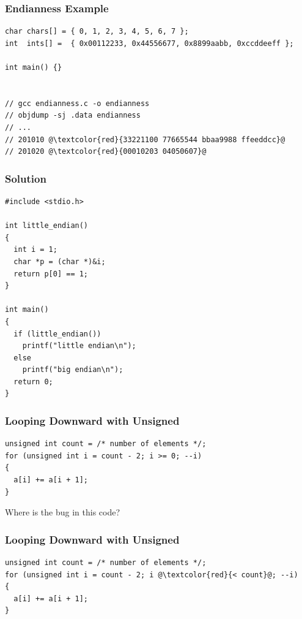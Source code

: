 \documentclass{beamer}
\newcounter{exo}
\newcommand{\exo}{
  \addtocounter{exo}{1}
  Exercice \arabic{exo}
}
\begin{document}
\begin{frame}[fragile]
\frametitle{Endianness Example}
\scriptsize
\begin{lstlisting}
char chars[] = { 0, 1, 2, 3, 4, 5, 6, 7 };
int  ints[] =  { 0x00112233, 0x44556677, 0x8899aabb, 0xccddeeff };

int main() {}


// gcc endianness.c -o endianness
// objdump -sj .data endianness
// ...
// 201010 @\textcolor{red}{33221100 77665544 bbaa9988 ffeeddcc}@
// 201020 @\textcolor{red}{00010203 04050607}@
\end{lstlisting}

\end{frame}


\ifanswers

\begin{frame}[fragile]
\frametitle{Solution}
\scriptsize

\begin{lstlisting}
#include <stdio.h>

int little_endian()
{
  int i = 1;
  char *p = (char *)&i;
  return p[0] == 1;
}

int main()
{
  if (little_endian())
    printf("little endian\n");
  else
    printf("big endian\n");
  return 0;
}
\end{lstlisting}

\end{frame}

\fi

\begin{frame}[fragile]
\frametitle{Looping Downward with Unsigned}

\begin{lstlisting}
unsigned int count = /* number of elements */;
for (unsigned int i = count - 2; i >= 0; --i)
{
  a[i] += a[i + 1];
}
\end{lstlisting}

\vspace{0.5cm}
Where is the bug in this code?
\end{frame}

\begin{frame}[fragile]
\frametitle{Looping Downward with Unsigned}

\begin{lstlisting}
unsigned int count = /* number of elements */;
for (unsigned int i = count - 2; i @\textcolor{red}{< count}@; --i)
{
  a[i] += a[i + 1];
}
\end{lstlisting}

\end{frame}
\end{document}
